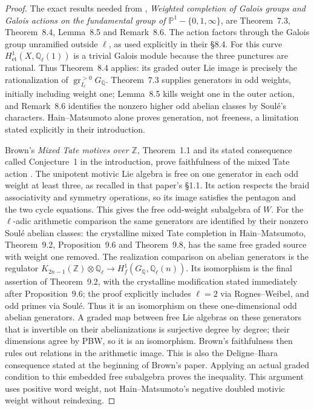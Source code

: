\begin{proof}
The exact results needed from
\citet{HM2003}, \emph{Weighted completion of Galois groups and Galois
actions on the fundamental group of $\mathbb P^1-\{0,1,\infty\}$},
are Theorem~7.3, Theorem~8.4, Lemma~8.5 and Remark~8.6.
The action factors through the Galois group unramified outside $\ell$,
as used explicitly in their \S8.4.
For this curve $H^1_{\mathrm{et}}(X,\mathbb Q_\ell(1))$ is a trivial
Galois module because the three punctures are rational.  Thus
Theorem~8.4 applies: its graded outer Lie image is precisely the
rationalization of $\operatorname{gr}^{>0}_{I_\ell}G_{\mathbb Q}$.
Theorem~7.3 supplies generators in odd weights, initially including
weight one; Lemma~8.5 kills weight one in the outer action, and
Remark~8.6 identifies the nonzero higher odd abelian classes by
Soul\'e's characters.  Hain--Matsumoto alone proves generation, not
freeness, a limitation stated explicitly in their introduction.

Brown's \emph{Mixed Tate motives over $\mathbb Z$}, Theorem~1.1 and
its stated consequence called Conjecture~1 in the introduction,
prove faithfulness of the mixed Tate action
\citep{Brown2012g}.  The unipotent motivic Lie algebra is free on one
generator in each odd weight at least three, as recalled in that
paper's \S1.1.  Its action respects the braid associativity and
symmetry operations, so its image satisfies the pentagon and the two
cycle equations.  This gives the free odd-weight subalgebra of $W$.
For the $\ell$-adic arithmetic comparison the same generators are
identified by their nonzero Soul\'e abelian classes: the crystalline
mixed Tate completion in Hain--Matsumoto, Theorem~9.2, Proposition~9.6 and
Theorem~9.8, has the same free graded source with weight one removed.
The realization comparison on abelian generators is the regulator
$K_{2n-1}(\mathbb Z)\otimes\mathbb Q_\ell\to H^1_f(G_{\mathbb Q},\mathbb Q_\ell(n))$.
Its isomorphism is the final assertion of Theorem~9.2, with the
crystalline modification stated immediately after Proposition~9.6;
the proof explicitly includes $\ell=2$ via Rognes--Weibel, and odd
primes via Soul\'e.  Thus it is an isomorphism on these one-dimensional
odd abelian generators.  A graded map between free Lie algebras on
these generators that is invertible on their abelianizations is
surjective degree by degree; their dimensions agree by PBW, so it is
an isomorphism.  Brown's faithfulness then rules out relations in the
arithmetic image.  This is also the Deligne--Ihara consequence stated
at the beginning of Brown's paper.  Applying an actual graded
condition to this embedded free subalgebra proves the inequality.
This argument uses positive word weight, not Hain--Matsumoto's
negative doubled motivic weight without reindexing.
\end{proof}

